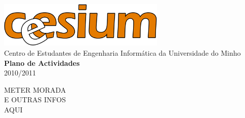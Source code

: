 \begin{titlepage}
	\begin{center}
		\vspace*{\fill}
		\includegraphics[width=0.6\textwidth]{files/cesiumLogoSolido}\\
		Centro de Estudantes de Engenharia Informática da Universidade do Minho\\

		\vspace{20pt}
		\Huge\textbf{Plano de Actividades}\\

		\vspace{15pt}
		\huge{2010/2011}
		\vspace*{\fill}
	\end{center}

	\begin{flushright}
	METER MORADA\\
	E OUTRAS INFOS\\
	AQUI\\
	\end{flushright}
\end{titlepage}
